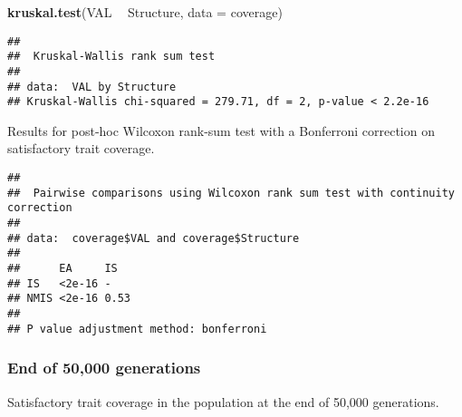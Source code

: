 \documentclass[]{book}
\newenvironment{Shaded}{\begin{snugshade}}{\end{snugshade}}
\newcommand{\DataTypeTok}[1]{\textcolor[rgb]{0.13,0.29,0.53}{#1}}
\newcommand{\KeywordTok}[1]{\textcolor[rgb]{0.13,0.29,0.53}{\textbf{#1}}}
\newcommand{\NormalTok}[1]{#1}
\newcommand{\OperatorTok}[1]{\textcolor[rgb]{0.81,0.36,0.00}{\textbf{#1}}}
\newcommand{\OtherTok}[1]{\textcolor[rgb]{0.56,0.35,0.01}{#1}}
\newcommand{\StringTok}[1]{\textcolor[rgb]{0.31,0.60,0.02}{#1}}
\begin{document}
\begin{Shaded}
\begin{Highlighting}[]
\KeywordTok{kruskal.test}\NormalTok{(VAL }\OperatorTok{~}\StringTok{ }\NormalTok{Structure, }\DataTypeTok{data =}\NormalTok{ coverage)}
\end{Highlighting}
\end{Shaded}

\begin{verbatim}
## 
##  Kruskal-Wallis rank sum test
## 
## data:  VAL by Structure
## Kruskal-Wallis chi-squared = 279.71, df = 2, p-value < 2.2e-16
\end{verbatim}

Results for post-hoc Wilcoxon rank-sum test with a Bonferroni correction on satisfactory trait coverage.

\begin{Shaded}
\end{Shaded}

\begin{verbatim}
## 
##  Pairwise comparisons using Wilcoxon rank sum test with continuity correction 
## 
## data:  coverage$VAL and coverage$Structure 
## 
##      EA     IS  
## IS   <2e-16 -   
## NMIS <2e-16 0.53
## 
## P value adjustment method: bonferroni
\end{verbatim}

\hypertarget{end-of-50000-generations}{%
\subsubsection{End of 50,000 generations}\label{end-of-50000-generations}}

Satisfactory trait coverage in the population at the end of 50,000 generations.
\end{document}
